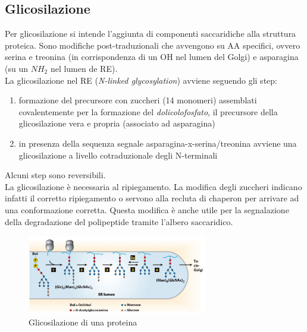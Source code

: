     \subsection{Glicosilazione}
        Per glicosilazione si intende l'aggiunta di componenti saccaridiche alla struttura proteica. Sono modifiche post-traduzionali che avvengono su AA specifici, ovvero serina e treonina (in corrispondenza di un OH nel lumen del Golgi) e asparagina (su un $NH_{2}$ nel lumen de RE).  \\
        La glicosilazione nel RE (\textit{N-linked glycosylation}) avviene seguendo gli step:
        \begin{enumerate}
            \item formazione del precursore con zuccheri (14 monomeri) assemblati covalentemente per la formazione del \textit{dolicolofosfato}, il precursore della glicosilazione vera e propria (associato ad asparagina)
            \item in presenza della sequenza segnale asparagina-x-serina/treonina avviene una glicosilazione a livello cotraduzionale degli N-terminali
        \end{enumerate}
        Alcuni step sono reversibili.\\
        La glicosilazione è necessaria al ripiegamento. La modifica degli zuccheri indicano infatti il corretto ripiegamento o servono alla recluta di chaperon per arrivare ad una conformazione corretta. Questa modifica è anche utile per la segnalazione della degradazione del polipeptide tramite l'albero saccaridico. 
        \begin{figure}[h]
            \centering
            \includegraphics[width=0.7\textwidth]{images/glicosilazine.JPG}
            \caption{\small Glicosilazione di una proteina}
            \label{fig:mesh1}
        \end{figure}
        
